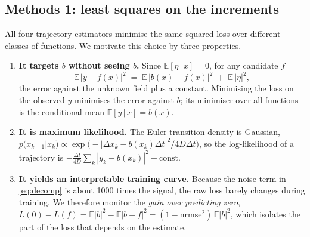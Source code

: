 \documentclass[11pt,a4paper]{article}
\newcommand{\dt}{\Delta t}
\newcommand{\dx}{\Delta x}
\newcommand{\E}{\mathbb{E}}
\begin{document}
\subsection{Methods 1: least squares on the increments}

All four trajectory estimators minimise the same squared loss over different classes of
functions. We motivate this choice by three properties.

\begin{enumerate}[leftmargin=1.4em,itemsep=0.15em]
\item \textbf{It targets $b$ without seeing $b$.} Since $\E[\eta\,|\,x]=0$, for any candidate
      $f$
      \begin{equation}
        \E\,|y - f(x)|^2 \;=\; \E\,|b(x)-f(x)|^2 \;+\; \E\,|\eta|^2 ,
        \label{eq:decomp}
      \end{equation}
      the error against the unknown field plus a constant. Minimising the loss on the
      observed $y$ minimises the error against $b$; its minimiser over all functions is the
      conditional mean $\E[y\,|\,x]=b(x)$.
\item \textbf{It is maximum likelihood.} The Euler transition density is Gaussian,
      $p(x_{k+1}|x_k)\propto\exp\!\big(-|\dx_k-b(x_k)\dt|^2/4D\dt\big)$, so the
      log-likelihood of a trajectory is $-\frac{\dt}{4D}\sum_k|y_k-b(x_k)|^2+\text{const}$.
\item \textbf{It yields an interpretable training curve.} Because the noise term in
      \eqref{eq:decomp} is about 1000 times the signal, the raw loss barely changes during
      training. We therefore monitor the \emph{gain over predicting zero},
      $L(0)-L(f) = \E|b|^2-\E|b-f|^2 = (1-\mathrm{nrmse}^2)\,\E|b|^2$, which isolates the part
      of the loss that depends on the estimate.
\end{enumerate}
\end{document}
